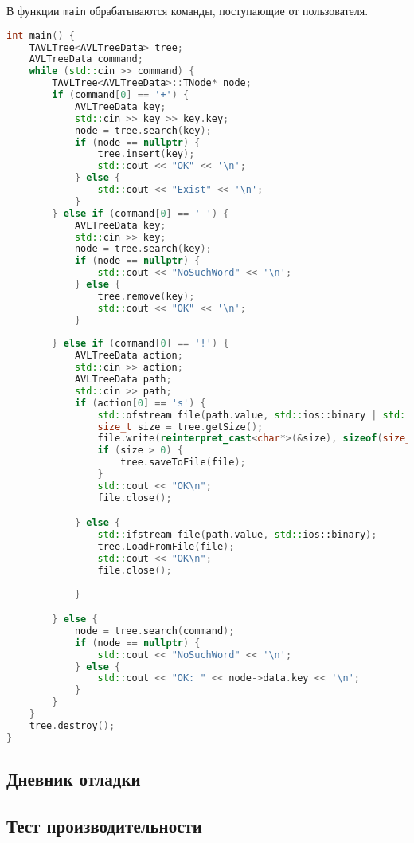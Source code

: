 \documentclass[12pt]{article}
\begin{document}
В функции \texttt{main} обрабатываются команды, поступающие от пользователя.

\begin{lstlisting}[language=C++]
int main() {
    TAVLTree<AVLTreeData> tree;
    AVLTreeData command;
    while (std::cin >> command) {
        TAVLTree<AVLTreeData>::TNode* node;
        if (command[0] == '+') {
            AVLTreeData key;
            std::cin >> key >> key.key;
            node = tree.search(key);
            if (node == nullptr) {
                tree.insert(key);
                std::cout << "OK" << '\n';
            } else {
                std::cout << "Exist" << '\n';
            }
        } else if (command[0] == '-') {
            AVLTreeData key;
            std::cin >> key;
            node = tree.search(key);
            if (node == nullptr) {
                std::cout << "NoSuchWord" << '\n';
            } else {
                tree.remove(key);
                std::cout << "OK" << '\n';
            }
        
        } else if (command[0] == '!') {
            AVLTreeData action;
            std::cin >> action;
            AVLTreeData path;
            std::cin >> path;
            if (action[0] == 's') {   
                std::ofstream file(path.value, std::ios::binary | std::ios::trunc);
                size_t size = tree.getSize();
                file.write(reinterpret_cast<char*>(&size), sizeof(size_t));
                if (size > 0) {
                    tree.saveToFile(file);
                }
                std::cout << "OK\n";
                file.close();

            } else {
                std::ifstream file(path.value, std::ios::binary);
                tree.LoadFromFile(file);
                std::cout << "OK\n";
                file.close();
   
            }

        } else {
            node = tree.search(command);
            if (node == nullptr) {
                std::cout << "NoSuchWord" << '\n';
            } else {
                std::cout << "OK: " << node->data.key << '\n';
            }
        }
    }
    tree.destroy();
}
\end{lstlisting}

\subsection*{Дневник отладки}

\subsection*{Тест производительности}
\end{document}
